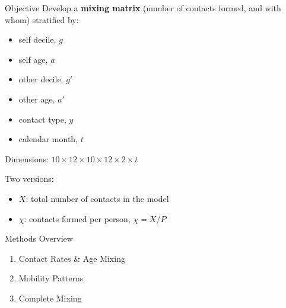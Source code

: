 \begin{frame}{Objective}
  Develop a \textbf{mixing matrix}
  (number of contacts formed, and with whom)
  stratified by:
  \par\bigskip
  \begin{minipage}{.33\linewidth}
    \begin{itemize}
      \item self decile, $g$
      \item self age, $a$
    \end{itemize}
  \end{minipage}%
  \begin{minipage}{.33\linewidth}
    \begin{itemize}
      \item other decile, $g'$
      \item other age, $a'$
    \end{itemize}
  \end{minipage}%
  \begin{minipage}{.33\linewidth}
    \begin{itemize}
      \item contact type, $y$
      \item calendar month, $t$
    \end{itemize}
  \end{minipage}
  \par\bigskip
  Dimensions: $10 \times 12 \times 10 \times 12 \times 2 \times t$
  \par\bigskip
  Two versions:
  \begin{itemize}
    \item $X$: total number of contacts in the model
    \item $\chi$: contacts formed per person,\quad
    $\chi = X / P$
  \end{itemize}
\end{frame}
\begin{frame}{Methods Overview}
  \begin{enumerate}
    \item Contact Rates \& Age Mixing
    \item Mobility Patterns
    \item Complete Mixing
  \end{enumerate}
\end{frame}
